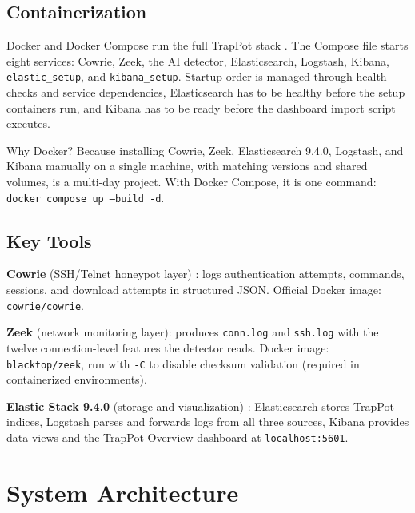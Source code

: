 \subsection{Containerization}
\label{subsec:containerization}

Docker and Docker Compose run the full TrapPot stack \cite{9359711,commey2025blockchain}. The Compose file starts eight services: Cowrie, Zeek, the AI detector, Elasticsearch, Logstash, Kibana, \texttt{elastic\_setup}, and \texttt{kibana\_setup}. Startup order is managed through health checks and service dependencies, Elasticsearch has to be healthy before the setup containers run, and Kibana has to be ready before the dashboard import script executes.

Why Docker? Because installing Cowrie, Zeek, Elasticsearch 9.4.0, Logstash, and Kibana manually on a single machine, with matching versions and shared volumes, is a multi-day project. With Docker Compose, it is one command: \texttt{docker compose up --build -d}.

\subsection{Key Tools}
\label{subsec:data_tools}

\textbf{Cowrie} (SSH/Telnet honeypot layer) \cite{9071014,9359711,9558948}: logs authentication attempts, commands, sessions, and download attempts in structured JSON. Official Docker image: \texttt{cowrie/cowrie}.

\textbf{Zeek} (network monitoring layer): produces \texttt{conn.log} and \texttt{ssh.log} with the twelve connection-level features the detector reads. Docker image: \texttt{blacktop/zeek}, run with \texttt{-C} to disable checksum validation (required in containerized environments).

\textbf{Elastic Stack 9.4.0} (storage and visualization) \cite{9001068,log2evt2025}: Elasticsearch stores TrapPot indices, Logstash parses and forwards logs from all three sources, Kibana provides data views and the TrapPot Overview dashboard at \texttt{localhost:5601}.

\section{System Architecture}
\label{sec:system_architecture}

